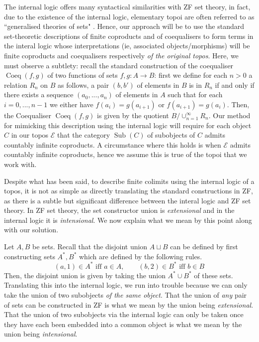 \documentclass{tac}
\newcommand{\call}[1]{\mathcal{#1}}
\newcommand{\lto}{\longrightarrow}
\begin{document}
	The internal logic offers many syntactical similarities with ZF set theory, in fact, due to the existence of the internal logic, elementary topoi are often referred to as ``generalised theories of sets" \cite[\S Prologue, page 1]{MM}. Hence, our approach will be to use the standard set-theoretic descriptions of finite coproducts and of coequalisers to form terms in the interal logic whose interpretations (ie, associated objects/morphisms) will be finite coproducts and coequalisers respectively \emph{of the original topos}. Here, we must observe a subtlety: recall the standard construction of the coequaliser $\operatorname{Coeq}(f,g)$ of two functions of sets $f,g:A \lto B$: first we define for each $n > 0$ a relation $R_n$ on $B$ as follows, a pair $(b,b')$ of elements in $B$ is in $R_n$ if and only if there exists a sequence $(a_0,...,a_n)$ of elements in $A$ such that for each $i = 0,...,n-1$ we either have $f(a_i) = g(a_{i+1})$ or $f(a_{i+1}) = g(a_i)$. Then, the Coequaliser $\operatorname{Coeq}(f,g)$ is given by the quotient $B/\cup_{n = 1}^\infty R_n$. Our method for mimicking this description using the internal logic will require for each object $C$ in our topos $\call{E}$ that the category $\operatorname{Sub}(C)$ of subobjects of $C$ admits countably infinite coproducts. A circumstance where this holds is when $\call{E}$ admits countably infinite coproducts, hence we assume this is true of the topoi that we work with.
	
	Despite what has been said, to describe finite colimits using the internal logic of a topos, it is not as simple as directly translating the standard constructions in ZF, as there is a subtle but significant difference between the interal logic and ZF set theory. In ZF set theory, the set constructor union is \emph{extensional} and in the internal logic it is \emph{intensional}. We now explain what we mean by this point along with our solution.
	
	Let $A,B$ be sets. Recall that the disjoint union $A \sqcup B$ can be defined by first constructing sets $A^\ast,B^\ast$ which are defined by the following rules.
	\begin{equation}
		(a,1) \in A^\ast \text{ iff }a \in A,\qquad (b,2) \in B^\ast \text{ iff } b \in B
	\end{equation}
	Then, the disjoint union is given by taking the union $A^\ast \cup B^\ast$ of these sets. Translating this into the internal logic, we run into trouble because we can only take the union of two subobjects \emph{of the same object}. That the union of \emph{any} pair of sets can be constructed in ZF is what we mean by the union being \emph{extensional}. That the union of two subobjects via the internal logic can only be taken once they have each been embedded into a common object is what we mean by the union being \emph{intensional}.
	
\end{document}
